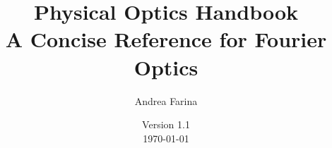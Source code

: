 \documentclass[
    12pt,
    a4paper,
    oneside,
    openany
]{book}
\newcommand{\version}{1.1}
\begin{document}

\frontmatter

\title{
    \Huge\bfseries Physical Optics Handbook\\[0.4cm]
    \Large A Concise Reference for Fourier Optics
}

\author{Andrea Farina}

\date{
Version \version\\
\today
}

\maketitle

\tableofcontents


\mainmatter














% 

% 

% 

% 



% 

% 


% 
% 

\end{document}
